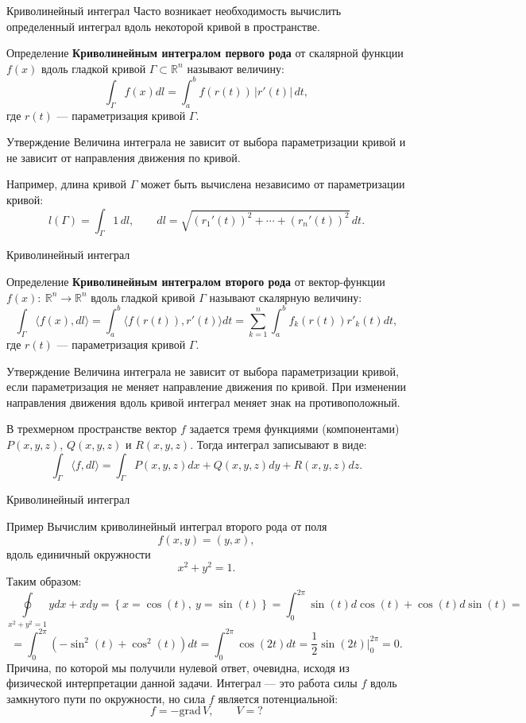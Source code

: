 \documentclass[8pt]{beamer}
\newcommand{\grad}{\mathrm{grad\,}}
\begin{document}
\begin{frame}{Криволинейный интеграл}
Часто возникает необходимость вычислить определенный интеграл вдоль некоторой кривой в пространстве.
\begin{block}{Определение}
{\bf Криволинейным интегралом первого рода} от скалярной функции $f(x)$ вдоль гладкой кривой $\Gamma\subset\mathbb{R}^n$ называют величину:
$$\int_\Gamma f(x)dl = \int_a^b f(r(t))\, |r'(t)|\, dt,$$
где $r(t)$ --- параметризация кривой $\Gamma$.
\end{block}
\begin{block}{Утверждение}
Величина интеграла не зависит от выбора параметризации кривой и не зависит от направления движения по кривой.
\end{block}
Например, длина кривой $\Gamma$ может быть вычислена независимо от параметризации кривой:
 $$l(\Gamma) = \int_\Gamma 1\,dl,\qquad dl=\sqrt{(r_1'(t))^2+\cdots + (r_n'(t))^2}\,dt.$$
\end{frame}

\begin{frame}{Криволинейный интеграл}
\begin{block}{Определение}
{\bf Криволинейным интегралом второго рода} от вектор-функции $f(x):\ \mathbb{R}^n \to \mathbb{R}^n$ вдоль гладкой кривой $\Gamma$ называют скалярную величину:
$$\int_\Gamma \langle f(x), dl \rangle = \int_a^b  \langle f(r(t)), r'(t) \rangle dt = \sum_{k=1}^n \int_a^b f_k(r(t))r'_k(t) dt,$$
где $r(t)$ --- параметризация кривой $\Gamma$.
\end{block}
\begin{block}{Утверждение}
Величина интеграла не зависит от выбора параметризации кривой, если параметризация не меняет направление движения по кривой. При изменении направления движения вдоль кривой интеграл меняет знак на противоположный.
\end{block}
В трехмерном пространстве вектор $f$ задается тремя функциями (компонентами) $P(x,y,z)$, $Q(x,y,z)$ и $R(x,y,z)$. Тогда интеграл записывают в виде:
$$\int_\Gamma \langle f , dl \rangle = \int_\Gamma P(x,y,z)dx+Q(x,y,z)dy+R(x,y,z)dz.$$
\end{frame}

\begin{frame}{Криволинейный интеграл}
\begin{block}{Пример}
Вычислим криволинейный интеграл второго рода от поля
$$f(x,y) = (y,x),$$
вдоль единичный окружности
$$x^2+y^2=1.$$
Таким образом:
$$\oint\limits_{x^2+y^2=1} ydx+xdy = \left\{ x=\cos(t),\ y=\sin(t) \right\} = \int_0^{2\pi} \sin(t)d\cos(t)+\cos(t)d\sin(t) =$$
$$= \int_0^{2\pi} \left(-\sin^2(t)+\cos^2(t)\right)dt =\int_0^{2\pi}\cos(2t)dt = \frac{1}{2}\sin(2t)\Big|_0^{2\pi} = 0.$$
Причина, по которой мы получили нулевой ответ, очевидна, исходя из физической интерпретации данной задачи. Интеграл --- это работа силы $f$ вдоль замкнутого пути по окружности, но сила $f$ является потенциальной:
$$f = - \grad V,\qquad V=?$$
\end{block}
\end{frame}
\end{document}
